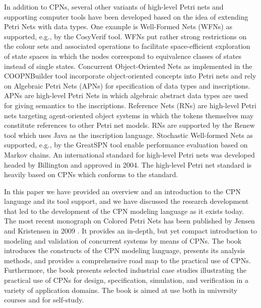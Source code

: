 In addition to CPNs, several other variants of high-level Petri nets
and supporting computer tools have been developed based on the idea of
extending Petri Nets with data types. One example is Well-Formed Nets
(WFNs) \cite{wfns} as supported, e.g., by the CosyVerif tool. WFNs put
rather strong restrictions on the colour sets and associated
operations to facilitate space-efficient exploration of state spaces
in which the nodes correspond to equivalence classes of states instead
of single states. Concurrent Object-Oriented Nets \cite{coopn} as
implemented in the COOPNBuilder tool incorporate object-oriented
concepts into Petri nets and rely on Algebraic Petri Nets (APNs)
\cite{apn} for specification of data types and inscriptions. APNs are
high-level Petri Nets in which algebraic abstract data types are used
for giving semantics to the inscriptions. Reference Nets (RNs)
\cite{rns} are high-level Petri nets targeting agent-oriented object
systems in which the tokens themselves may constitute references to
other Petri net models. RNs are supported by the Renew tool which uses
Java as the inscription language. Stochastic Well-formed Nets
\cite{swns} as supported, e.g., by the GreatSPN tool enable
performance evaluation based on Markov chains. An international
standard for high-level Petri nets was developed headed by Billington
\cite{hcpnstandard} and approved in 2004. The high-level Petri net
standard is heavily based on CPNs which conforms to the standard.



In this paper we have provided an overview and an introduction to the
CPN language and its tool support, and we have discussed the research
development that led to the development of the CPN modeling language
as it exists today. The most recent monograph on Colored Petri Nets
has been published by Jensen and Kristensen in 2009
\cite{newcpnbook}. It provides an in-depth, but yet compact
introduction to modeling and validation of concurrent systems by means
of CPNs. The book introduces the constructs of the CPN modeling
language, presents its analysis methods, and provides a comprehensive
road map to the practical use of CPNs. Furthermore, the book presents
selected industrial case studies illustrating the practical use of
CPNs for design, specification, simulation, and verification in a
variety of application domains. The book is aimed at use both in
university courses \cite{teaching} and for self-study.

